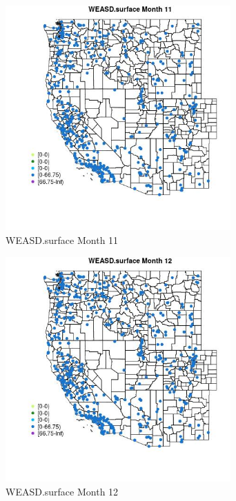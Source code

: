 \begin{figure} 
\centering  
\includegraphics[width=0.77\textwidth]{Code_Outputs/Report_ML_input_PM25_Step4_part_e_de_duplicated_aves_compiled_2019-05-14wNAs_MapObsMo11WEASDsurface.jpg} 
\caption{\label{fig:Report_ML_input_PM25_Step4_part_e_de_duplicated_aves_compiled_2019-05-14wNAsMapObsMo11WEASDsurface}WEASD.surface Month 11} 
\end{figure} 
 

\begin{figure} 
\centering  
\includegraphics[width=0.77\textwidth]{Code_Outputs/Report_ML_input_PM25_Step4_part_e_de_duplicated_aves_compiled_2019-05-14wNAs_MapObsMo12WEASDsurface.jpg} 
\caption{\label{fig:Report_ML_input_PM25_Step4_part_e_de_duplicated_aves_compiled_2019-05-14wNAsMapObsMo12WEASDsurface}WEASD.surface Month 12} 
\end{figure} 
 

